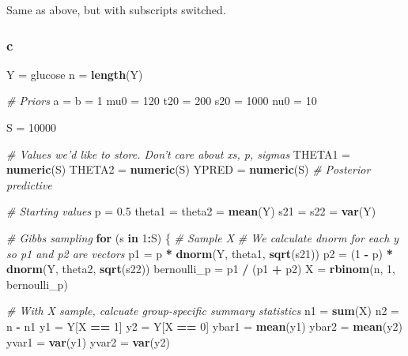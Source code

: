 \documentclass[]{article}
\newenvironment{Shaded}{\begin{snugshade}}{\end{snugshade}}
\newcommand{\CommentTok}[1]{\textcolor[rgb]{0.56,0.35,0.01}{\textit{#1}}}
\newcommand{\ControlFlowTok}[1]{\textcolor[rgb]{0.13,0.29,0.53}{\textbf{#1}}}
\newcommand{\DecValTok}[1]{\textcolor[rgb]{0.00,0.00,0.81}{#1}}
\newcommand{\FloatTok}[1]{\textcolor[rgb]{0.00,0.00,0.81}{#1}}
\newcommand{\KeywordTok}[1]{\textcolor[rgb]{0.13,0.29,0.53}{\textbf{#1}}}
\newcommand{\NormalTok}[1]{#1}
\newcommand{\OperatorTok}[1]{\textcolor[rgb]{0.81,0.36,0.00}{\textbf{#1}}}
\newcommand{\StringTok}[1]{\textcolor[rgb]{0.31,0.60,0.02}{#1}}
\begin{document}
Same as above, but with subscripts switched.

\hypertarget{c-1}{%
\subsubsection{c}\label{c-1}}

\begin{Shaded}
\begin{Highlighting}[]
\NormalTok{Y =}\StringTok{ }\NormalTok{glucose}
\NormalTok{n =}\StringTok{ }\KeywordTok{length}\NormalTok{(Y)}

\CommentTok{# Priors}
\NormalTok{a =}\StringTok{ }\NormalTok{b =}\StringTok{ }\DecValTok{1}
\NormalTok{mu0 =}\StringTok{ }\DecValTok{120}
\NormalTok{t20 =}\StringTok{ }\DecValTok{200}
\NormalTok{s20 =}\StringTok{ }\DecValTok{1000}
\NormalTok{nu0 =}\StringTok{ }\DecValTok{10}

\NormalTok{S =}\StringTok{ }\DecValTok{10000}

\CommentTok{# Values we'd like to store. Don't care about xs, p, sigmas}
\NormalTok{THETA1 =}\StringTok{ }\KeywordTok{numeric}\NormalTok{(S)}
\NormalTok{THETA2 =}\StringTok{ }\KeywordTok{numeric}\NormalTok{(S)}
\NormalTok{YPRED =}\StringTok{ }\KeywordTok{numeric}\NormalTok{(S) }\CommentTok{# Posterior predictive}

\CommentTok{# Starting values}
\NormalTok{p =}\StringTok{ }\FloatTok{0.5}
\NormalTok{theta1 =}\StringTok{ }\NormalTok{theta2 =}\StringTok{ }\KeywordTok{mean}\NormalTok{(Y)}
\NormalTok{s21 =}\StringTok{ }\NormalTok{s22 =}\StringTok{ }\KeywordTok{var}\NormalTok{(Y)}

\CommentTok{# Gibbs sampling}
\ControlFlowTok{for}\NormalTok{ (s }\ControlFlowTok{in} \DecValTok{1}\OperatorTok{:}\NormalTok{S) \{}
  \CommentTok{# Sample X}
  \CommentTok{# We calculate dnorm for each y so p1 and p2 are vectors}
\NormalTok{  p1 =}\StringTok{ }\NormalTok{p }\OperatorTok{*}\StringTok{ }\KeywordTok{dnorm}\NormalTok{(Y, theta1, }\KeywordTok{sqrt}\NormalTok{(s21))}
\NormalTok{  p2 =}\StringTok{ }\NormalTok{(}\DecValTok{1} \OperatorTok{-}\StringTok{ }\NormalTok{p) }\OperatorTok{*}\StringTok{ }\KeywordTok{dnorm}\NormalTok{(Y, theta2, }\KeywordTok{sqrt}\NormalTok{(s22))}
\NormalTok{  bernoulli_p =}\StringTok{ }\NormalTok{p1 }\OperatorTok{/}\StringTok{ }\NormalTok{(p1 }\OperatorTok{+}\StringTok{ }\NormalTok{p2)}
\NormalTok{  X =}\StringTok{ }\KeywordTok{rbinom}\NormalTok{(n, }\DecValTok{1}\NormalTok{, bernoulli_p)}
  
  \CommentTok{# With X sample, calcuate group-specific summary statistics}
\NormalTok{  n1 =}\StringTok{ }\KeywordTok{sum}\NormalTok{(X)}
\NormalTok{  n2 =}\StringTok{ }\NormalTok{n }\OperatorTok{-}\StringTok{ }\NormalTok{n1}
\NormalTok{  y1 =}\StringTok{ }\NormalTok{Y[X }\OperatorTok{==}\StringTok{ }\DecValTok{1}\NormalTok{]}
\NormalTok{  y2 =}\StringTok{ }\NormalTok{Y[X }\OperatorTok{==}\StringTok{ }\DecValTok{0}\NormalTok{]}
\NormalTok{  ybar1 =}\StringTok{ }\KeywordTok{mean}\NormalTok{(y1)}
\NormalTok{  ybar2 =}\StringTok{ }\KeywordTok{mean}\NormalTok{(y2)}
\NormalTok{  yvar1 =}\StringTok{ }\KeywordTok{var}\NormalTok{(y1)}
\NormalTok{  yvar2 =}\StringTok{ }\KeywordTok{var}\NormalTok{(y2)}
  

\end{Highlighting}
\end{Shaded}
\end{document}
